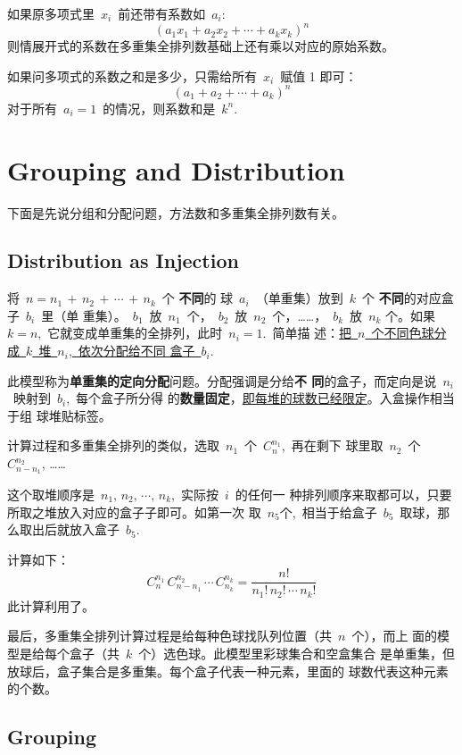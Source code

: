 如果原多项式里~$x_i$~前还带有系数如~$a_i$:
\[ (a_1x_1 + a_2x_2 + \cdots + a_kx_k)^n \]
则情展开式的系数在多重集全排列数基础上还有乘以对应的原始系数。

如果问多项式的系数之和是多少，只需给所有~$x_i$~赋值 1 即可：
\[ (a_1 + a_2 + \cdots + a_k)^n \]
对于所有~$a_i = 1$~的情况，则系数和是~$k^n$.

\section{Grouping and Distribution}
\label{sec:group-distr}

下面是先说分组和分配问题，方法数和多重集全排列数有关。

\subsection{Distribution as Injection}
\label{sec:distr-inject}

将~$n = n_1\, +\, n_2\, +\, \cdots\, +\, n_k$~个 \textbf{不同}的
球~$a_i$~（单重集）放到~$k$~个 \textbf{不同}的对应盒子~$b_i$~里（单
重集）。~$b_1$~放~$n_1$~个，~$b_2$~放~$n_2$~个，……，~$b_k$~放~$n_k$
个。如果~$k = n$,~它就变成单重集的全排列，此时~$n_i = 1$.~简单描
述：\uline{把~$n$~个不同色球分成~$k$~堆~$n_i$,~依次分配给不同
  盒子~$b_i$}.

此模型称为\textbf{单重集的定向分配}问题。分配强调是分给\textbf{不
  同}的盒子，而定向是说~$n_i$~映射到~$b_i$,~每个盒子所分得
的\textbf{数量固定}，\uline{即每堆的球数已经限定}。入盒操作相当于组
球堆贴标签。

计算过程和多重集全排列的类似，选取~$n_1$~个~$C_n^{n_1}$,~再在剩下
球里取~$n_2$~个~$C_{n - n_1}^{n_2}$, ……

这个取堆顺序是~$n_1,\, n_2,\, \cdots,\, n_k$,~实际按~$i$~的任何一
种排列顺序来取都可以，只要所取之堆放入对应的盒子子即可。如第一次
取~$n_5$个,~相当于给盒子~$b_5$~取球，那么取出后就放入盒子~$b_5$.

计算如下：
\[ C_n^{n_1}\,C_{n - n_1}^{n_2}\,\cdots\,C_{n_k}^{n_k} = \frac{n!}{ n_1!\, n_2!\, \cdots\, n_k! } \]
此计算利用了。

最后，多重集全排列计算过程是给每种色球找队列位置（共~$n$~个），而上
面的模型是给每个盒子（共~$k$~个）选色球。此模型里彩球集合和空盒集合
是单重集，但放球后，盒子集合是多重集。每个盒子代表一种元素，里面的
球数代表这种元素的个数。

\subsection{Grouping}
\label{sec:grouping}

